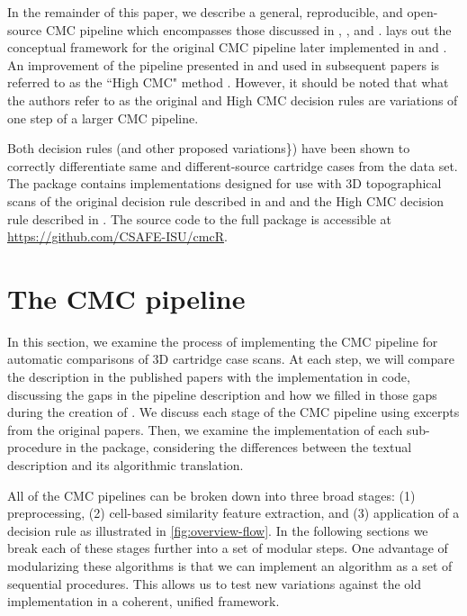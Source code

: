 In the remainder of this paper, we describe a general, reproducible, and
open-source CMC pipeline which encompasses those discussed in
\citet{song_proposed_2013}, \citet{song_3d_2014}, and
\citet{tong_improved_2015}. \citet{song_proposed_2013} lays out the
conceptual framework for the original CMC pipeline later implemented in
\citet{song_3d_2014} and \citet{tong_fired_2014}. An improvement of the
pipeline presented in \citet{tong_improved_2015} and used in subsequent
papers is referred to as the ``High CMC" method
\citep{chen_convergence_2017}. However, it should be noted that what the
authors refer to as the original and High CMC decision rules are
variations of one step of a larger CMC pipeline.

Both decision rules (and other proposed variations\}) have been shown to
correctly differentiate same and different-source cartridge cases from
the \citet{fadul_empirical_2011} data set. The  package
contains implementations designed for use with 3D topographical scans of
the original decision rule described in \citet{song_proposed_2013} and
\citet{song_3d_2014} and the High CMC decision rule described in
\citet{tong_improved_2015}. The source code to the full 
package is accessible at \url{https://github.com/CSAFE-ISU/cmcR}.

\hypertarget{cmcMethod}{%
\section{The CMC pipeline}\label{cmcMethod}}

In this section, we examine the process of implementing the CMC pipeline
for automatic comparisons of 3D cartridge case scans. At each step, we
will compare the description in the published papers with the
implementation in code, discussing the gaps in the pipeline description
and how we filled in those gaps during the creation of .
We discuss each stage of the CMC pipeline using excerpts from the
original papers. Then, we examine the implementation of each
sub-procedure in the  package, considering the differences
between the textual description and its algorithmic translation.

All of the CMC pipelines can be broken down into three broad stages: (1)
preprocessing, (2) cell-based similarity feature extraction, and (3)
application of a decision rule as illustrated in
\autoref{fig:overview-flow}. In the following sections we break each of
these stages further into a set of modular steps. One advantage of
modularizing these algorithms is that we can implement an algorithm as a
set of sequential procedures. This allows us to test new variations
against the old implementation in a coherent, unified framework.

